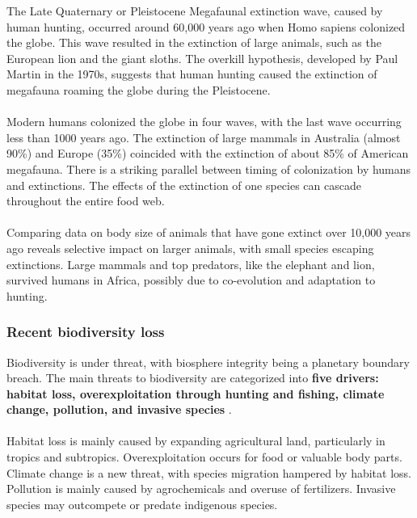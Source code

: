 \documentclass[../summary.tex]{subfiles}
\begin{document}
The Late Quaternary or Pleistocene Megafaunal extinction wave, caused by human hunting, occurred around 60,000 years ago when Homo sapiens colonized the globe. This wave resulted in the extinction of large animals, such as the European lion and the giant sloths. The overkill hypothesis, developed by Paul Martin in the 1970s, suggests that human hunting caused the extinction of megafauna roaming the globe during the Pleistocene. \\
\\
Modern humans colonized the globe in four waves, with the last wave occurring less than 1000 years ago. The extinction of large mammals in Australia (almost 90\%) and Europe (35\%) coincided with the extinction of about 85\% of American megafauna. There is a striking parallel between timing of colonization by humans and extinctions. The effects of the extinction of one species can cascade throughout the entire food web.\\
\\
Comparing data on body size of animals that have gone extinct over 10,000 years ago reveals selective impact on larger animals, with small species escaping extinctions. Large mammals and top predators, like the elephant and lion, survived humans in Africa, possibly due to co-evolution and adaptation to hunting.

\subsubsection{Recent biodiversity loss}

Biodiversity is under threat, with biosphere integrity being a planetary boundary breach. The main threats to biodiversity are categorized into \textbf{five drivers: habitat loss, overexploitation through hunting and fishing, climate change, pollution, and invasive species }. \\
\\
Habitat loss is mainly caused by expanding agricultural land, particularly in tropics and subtropics. Overexploitation occurs for food or valuable body parts. Climate change is a new threat, with species migration hampered by habitat loss. Pollution is mainly caused by agrochemicals and overuse of fertilizers. Invasive species may outcompete or predate indigenous species.
\end{document}
